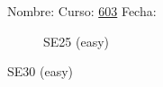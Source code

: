 \documentclass[landscape,10pt]{article}
\title{}
\author{Germán Avendaño Ramírez}
\begin{document}
Nombre: \hrulefill Curso: \underline{603} Fecha: \underline{\hspace{100pt}}
\vspace{25pt}
\begin{figure}[scale=.8]
\begin{minipage}{0.95\linewidth}\begin{center}
SE25 (easy) \\
\end{center}\end{minipage} 
\end{figure}



\begin{minipage}{0.95\linewidth}\begin{center}
SE30 (easy) \\
\end{center}\end{minipage}
\end{document}

